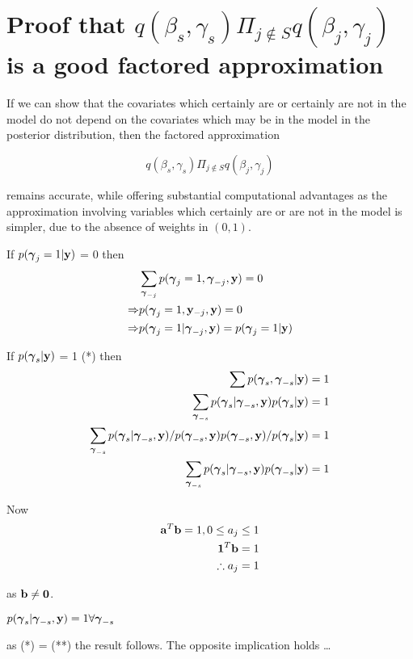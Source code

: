 \documentclass{amsart}[12pt]
\begin{document}
\section{Proof that $q(\beta_s, \gamma_s) \Pi_{j \notin S} q(\beta_j, \gamma_j)$ is a good factored approximation}

If we can show that the covariates which certainly are or certainly are not in the model do not depend on the
covariates which may be in the model in the posterior distribution, then the factored approximation

\[
	q(\beta_s, \gamma_s) \Pi_{j \notin S} q(\beta_j, \gamma_j)
\]

remains accurate, while offering substantial computational advantages as the approximation involving variables
which certainly are or are not in the model is simpler, due to the absence of weights in $(0, 1)$.

If $p({\boldsymbol \gamma}_j = 1|{\bf y})$ = 0
then
\begin{align*}
&\sum_{{\boldsymbol \gamma}_{-j}} p({\boldsymbol \gamma}_j=1, {\boldsymbol \gamma}_{-j}, {\bf y}) = 0 \\
\Rightarrow &p({\boldsymbol \gamma}_j = 1, {\bf y}_{-j}, {\bf y}) = 0 \\
\Rightarrow &p({\boldsymbol \gamma}_j = 1| {\boldsymbol \gamma}_{-j}, {\bf y}) = p({\boldsymbol \gamma}_j=1|{\bf y}) \\
\end{align*}

If $p({\boldsymbol \gamma}_s|{\bf y})$ = 1 (*)
then
\begin{align*}
\sum p({\boldsymbol \gamma}_s, {\boldsymbol \gamma}_{-s}|{\bf y}) = 1 \\
\sum_{{\boldsymbol \gamma}_{-s}} p({\boldsymbol \gamma}_s|{\boldsymbol \gamma}_{-s}, {\bf y}) p({\boldsymbol \gamma}_s|{\bf y}) = 1 \\
\sum_{{\boldsymbol \gamma}_{-s}} p({\boldsymbol \gamma}_s|{\boldsymbol \gamma}_{-s}, {\bf y}) / p({\boldsymbol \gamma}_{-s}, {\bf y}) p({\boldsymbol \gamma}_{-s}, {\bf y}) / p({\boldsymbol \gamma}_s|{\bf y}) = 1 \\
\sum_{{\boldsymbol \gamma}_{-s}} p({\boldsymbol \gamma}_s|{\boldsymbol \gamma}_{-s}, {\bf y}) p({\boldsymbol \gamma}_{-s}|{\bf y}) = 1 \\
\end{align*}

Now
\begin{align*}
{\bf a}^T {\bf b} = 1, 0 \leq a_j \leq 1 \\
{\bf 1}^T {\bf b} = 1 \\
\therefore a_j = 1 \\
\end{align*}

as ${\bf b} \ne {\bf0}$.

$p({\boldsymbol \gamma}_s|{\boldsymbol \gamma}_{-s}, {\bf y}) = 1 \forall {\boldsymbol\gamma}_{-s}$

as (*) = (**) the result follows. The opposite implication holds \ldots


\end{document}
